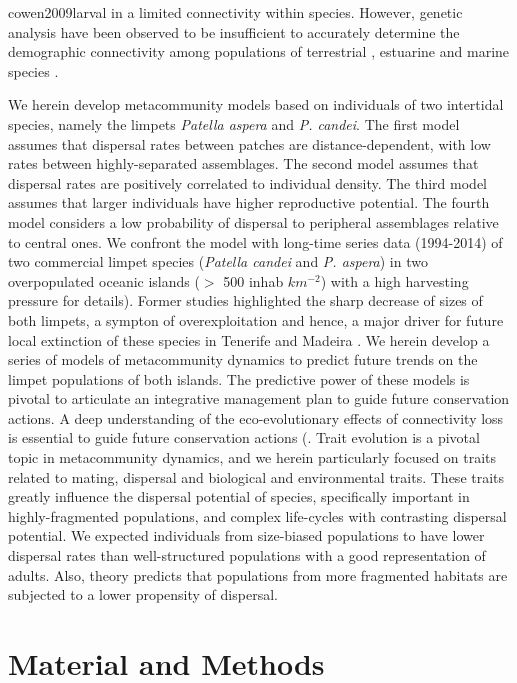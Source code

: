 \documentclass[12pt]{article}
\begin{document}
\begin{flushleft}
{{{{{{cowen2009larval} in a limited connectivity within species. However, genetic analysis have been observed to be insufficient to accurately determine the demographic connectivity among populations of terrestrial \citep{chapuis2011challenges}, estuarine \citep{turner2002genetic} and marine species \citep{hawkins2016fisheries}.

We herein develop metacommunity models based on individuals of two intertidal species, namely the limpets \textit{Patella aspera} and \textit{P. candei}. The first model assumes that dispersal rates between patches are distance-dependent, with low rates between highly-separated assemblages. The second model assumes that dispersal rates are positively correlated to individual density. The third model assumes that larger individuals have higher reproductive potential. The fourth model considers a low probability of dispersal to peripheral assemblages relative to central ones. We confront the model with long-time series data (1994-2014) of two commercial limpet species (\textit{Patella candei} and \textit{P. aspera}) in two overpopulated oceanic islands ($>$ 500 inhab $km^{-2}$) with a high harvesting pressure \citep{riera2016clear, sousa2019long} for details). Former studies highlighted the sharp decrease of sizes of both limpets, a sympton of overexploitation and hence, a major driver for future local extinction of these species in Tenerife \citep{riera2016clear} and Madeira \citep{sousa2019long}. We herein develop a series of models  of metacommunity dynamics to predict future trends on the limpet populations of both islands. The predictive power of these models is pivotal to articulate an integrative management plan to guide future conservation actions. A deep understanding of the eco-evolutionary effects of connectivity loss is essential to guide future conservation actions (\citep{travis2013dispersal, urban2001landscape}. Trait evolution is a pivotal topic in metacommunity dynamics, and we herein particularly focused on traits related to mating, dispersal and biological and environmental traits. These traits greatly influence the dispersal potential of species, specifically important in highly-fragmented populations, and complex life-cycles with contrasting dispersal potential.
We expected individuals from size-biased populations to have lower dispersal rates than well-structured populations with a good representation of adults. Also, theory predicts that populations from more fragmented habitats are subjected to a lower propensity of dispersal.

\section{Material and Methods}
}}}}}
\end{flushleft}
\end{document}
